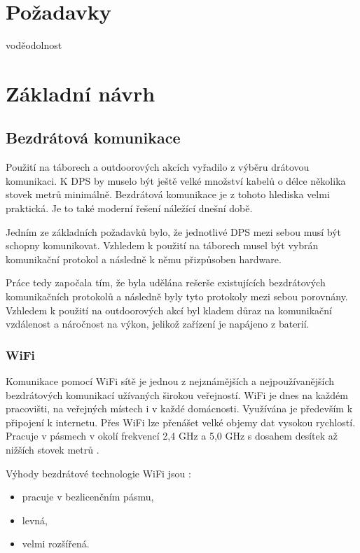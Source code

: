 \chapter{Požadavky}
voděodolnost


\chapter{Základní návrh}

\section{Bezdrátová komunikace}
Použití na táborech a outdoorových akcích vyřadilo z výběru drátovou komunikaci. K DPS by muselo být ještě velké množství kabelů 
o délce několika stovek metrů minimálně. Bezdrátová komunikace je z tohoto hlediska velmi praktická. Je to také moderní řešení 
náležící dnešní době. 

Jedním ze základních požadavků bylo, že jednotlivé DPS mezi sebou musí být schopny komunikovat. Vzhledem k použití na táborech 
musel být vybrán komunikační protokol a následně k němu přizpůsoben hardware. 

Práce tedy započala tím, že byla udělána rešerše existujících bezdrátových komunikačních protokolů a následně byly tyto protokoly 
mezi sebou porovnány. Vzhledem k použití na outdoorových akcí byl kladem důraz na komunikační vzdálenost a náročnost na výkon, 
jelikož zařízení je napájeno z baterií. 

\subsection{WiFi}
Komunikace pomocí WiFi sítě je jednou z nejznámějších a nejpoužívanějších bezdrátových komunikací užívaných širokou veřejností. 
WiFi je dnes na každém pracovišti, na veřejných místech i v každé domácnosti. Využívána je především k připojení k internetu. 
Přes WiFi lze přenášet velké objemy dat vysokou rychlostí. Pracuje v pásmech v okolí frekvencí 2,4 GHz a 5,0 GHz s dosahem 
desítek až nižších stovek metrů \cite{Bezdrat_muni}.

Výhody bezdrátové technologie WiFi jsou \cite{Bezdrat_muni}:
\begin{itemize}
  \item pracuje v bezlicenčním pásmu, %
  \item levná, %
  \item velmi rozšířená.
\end{itemize}

